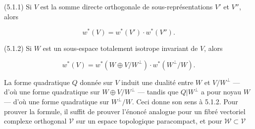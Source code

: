 \documentclass[9pt,twoside]{extarticle}
\begin{document}
{(5.1.1) Si \(V\) est la somme directe orthogonale de sous-représentations \(V'\) et \(V''\), alors\par

\[
w^*(V)=w^*(V')\cdot w^*(V'').
\]

(5.1.2) Si \(W\) est un sous-espace totalement isotrope invariant de \(V\), alors\par

\[
w^*(V)=w^*(W\oplus V/W^\perp)\cdot w^*(W^\perp/W).
\]

La forme quadratique \(Q\) donnée sur \(V\) induit une dualité entre \(W\) et \(V/W^\perp\) --- d’où une forme quadratique sur \(W\oplus V/W^\perp\) --- tandis que \(Q|W^\perp\) a pour noyau \(W\) --- d’où une forme quadratique sur \(W^\perp/W\). Ceci donne son sens à 5.1.2. Pour prouver la formule, il suffit de prouver l’énoncé analogue pour un fibré vectoriel complexe orthogonal \(\mathscr V\) sur un espace topologique paracompact, et pour \(\mathscr W\subset\mathscr V\)\par
}
\end{document}
